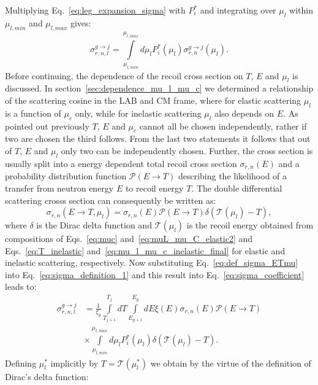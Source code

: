 \documentclass[review]{elsarticle}
\begin{document}
Multiplying Eq.~\ref{eq:leg_expansion_sigma} with $P_i^*$ and integrating over $\mu_l$ within $\mu_{l,min}$ and $\mu_{l,max}$ gives:
\begin{equation}\label{eq:sigma_coefficient}
   \sigma_{r,n,l}^{g \rightarrow j} = \int\limits_{\mu_{l,min}}^{\mu_{l,max}} d\mu_l P^*_i(\mu_l)\sigma_{r,n}^{g \rightarrow j} (\mu_l) .
\end{equation}
Before continuing, the dependence of the recoil cross section on $T$, $E$ and $\mu_l$ is discussed. In section~\ref{sec:dependence_mu_l_mu_c} we determined a relationship of the scattering cosine in the LAB and CM frame, where for elastic scattering $\mu_l$ is a function of $\mu_c$ only, while for inelastic scattering $\mu_l$ also depends on $E$. As pointed out previously $T$, $E$ and $\mu_c$ cannot all be chosen independently, rather if two are chosen the third follows. From the last two statements it follows that out of $T$, $E$ and $\mu_l$ only two can be independently chosen. Further, the cross section is usually split into a energy dependent total recoil cross section $ \sigma_{r,n}(E)$ and a probability distribution function $\mathcal{P}(E \rightarrow T)$ describing the likelihood of a transfer from neutron energy $E$ to recoil energy $T$. The double differential scattering crosss section can consequently be written as:
\begin{equation}\label{eq:def_sigma_ETmu}
  \sigma_{r,n}(E \rightarrow T, \mu_l) = \sigma_{r,n}(E) \mathcal{P}(E \rightarrow T)\delta(\mathcal{T}(\mu_l) - T ) ,
\end{equation}   
where $\delta$ is the Dirac delta function and $\mathcal{T}(\mu_l)$ is the recoil energy obtained from compositions of Eqs.~\ref{eq:muc} and~\ref{eq:muL_mu_C_elastic2} and Eqs.~\ref{eq:T_inelastic} and~\ref{eq:mu_l_mu_c_inelastic_final} for elastic and inelastic scattering, respectively. 
Now substituting Eq.~\ref{eq:def_sigma_ETmu} into Eq.~\ref{eq:sigma_definition_1} and this result into Eq.~\ref{eq:sigma_coefficient} leads to:
\begin{align}\label{eq:sigma_coefficient2}
   \sigma_{r,n,l}^{g \rightarrow j} &= \frac{1}{\xi_g}\int\limits_{T_{j+1}}^{T_j} dT \int\limits_{E_{g+1}}^{E_g} dE  \xi(E)   \sigma_{r,n}(E) \mathcal{P}(E \rightarrow T) \nonumber \\
                 & \times  \int\limits_{\mu_{l,min}}^{\mu_{l,max}} d\mu_l P^*_i(\mu_l)  \delta(\mathcal{T}(\mu_l) - T ).
\end{align}
Defining $\mu_l^*$ implicitly by $T=\mathcal{T}(\mu_l^*)$ we obtain by the virtue of the definition of Dirac's delta function:
\end{document}
